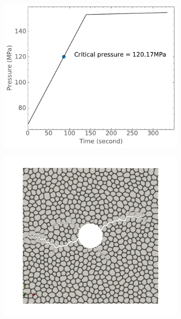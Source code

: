 \begin{figure}[htb!]
  \centering
  \begin{subfigure}[t]{0.32\linewidth}
    \centering
    \includegraphics[width=\linewidth]{Chapter3/figures/bubble_pressure_r0.25_ext0_rod196}
    \caption{}
  \end{subfigure}
  \begin{subfigure}[t]{0.32\linewidth}
    \centering
    \includegraphics[width=\linewidth]{Chapter3/figures/r25_ext0}

\end{subfigure}
\end{figure}
